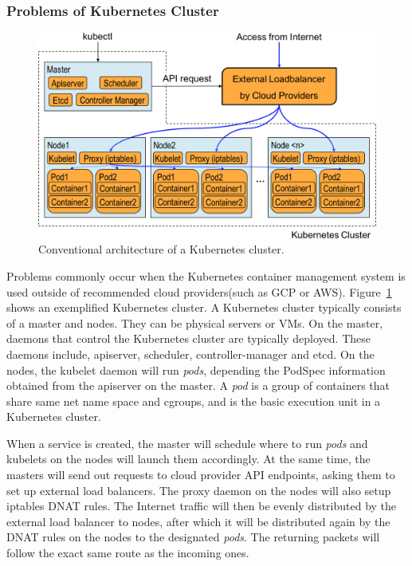 \subsubsection{Problems of Kubernetes Cluster}

\begin{figure}
\includegraphics[width=\columnwidth]{Figs/K8sConventional}
\caption{Conventional architecture of a Kubernetes cluster.}
\label{fig:K8sConventional}
\end{figure}

Problems commonly occur when the Kubernetes container management system is used outside of recommended cloud providers(such as GCP or AWS).
Figure~\ref{fig:K8sConventional} shows an exemplified Kubernetes cluster.
A Kubernetes cluster typically consists of a master and nodes. They can be physical servers or VMs.
On the master, daemons that control the Kubernetes cluster are typically deployed. 
These daemons include, apiserver, scheduler, controller-manager and etcd. 
On the nodes, the kubelet daemon will run {\it pods}, depending the PodSpec information obtained from the apiserver on the master.
A {\em pod} is a group of containers that share same net name space and cgroups, 
and is the basic execution unit in a Kubernetes cluster.

When a service is created, the master will schedule where to run {\em pods} and kubelets on the nodes will launch them accordingly.
At the same time, the masters will send out requests to cloud provider API endpoints, asking them to set up external load balancers.
The proxy daemon on the nodes will also setup iptables DNAT\cite{MartinA.Brown2017} rules. 
The Internet traffic will then be evenly distributed by the external load balancer to nodes, 
after which it will be distributed again by the DNAT rules on the nodes to the designated {\em pods}. 
The returning packets will follow the exact same route as the incoming ones.

